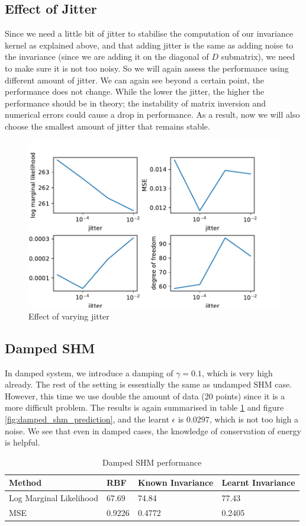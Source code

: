 \documentclass{statsmsc}
\begin{document}
\subsection{Effect of Jitter}
Since we need a little bit of jitter to stabilise the computation of our invariance kernel as explained above, and that adding jitter is the same as adding noise to the invariance (since we are adding it on the diagonal of $D$ submatrix), we need to make sure it is not too noisy. So we will again assess the performance using different amount of jitter.
We can again see beyond a certain point, the performance does not change. 
While the lower the jitter, the higher the performance should be in theory; the instability of matrix inversion and numerical errors could cause a drop in performance.
As a result, now we will also choose the smallest amount of jitter that remains stable.  

\begin{figure}[H] 
  \includegraphics[width=0.6\linewidth]{../codes/figures/vary_jitter.pdf}
  \centering
  \caption{Effect of varying jitter}
  \label{fig:vary_jitter}
\end{figure}

\subsection{Damped SHM}
In damped system, we introduce a damping of $\gamma=0.1$, which is very high already.
The rest of the setting is essentially the same as undamped SHM case.
However, this time we use double the amount of data (20 points) since it is a more difficult problem.
The results is again summarised in table \ref{tab:damped_shm_performance} and figure \ref{fig:damped_shm_prediction}, and the learnt $\epsilon$ is $0.0297$, which is not too high a noise.
We see that even in damped cases, the knowledge of conservation of energy is helpful.
\begin{table}[H]
  \centering
  \begin{tabular}{l l l l}
    \hline
Method           & RBF & Known Invariance&  Learnt Invariance\\
  \hline
    Log Marginal Likelihood & 67.69 & 74.84 & 77.43  \\
MSE & 0.9226 & 0.4772 & 0.2405 \\
    \hline
  \end{tabular}
  \caption{Damped SHM performance }
  \label{tab:damped_shm_performance}
\end{table}
\end{document}
